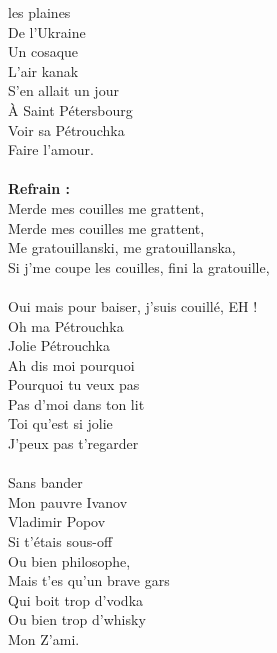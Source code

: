 
 les plaines
\\De l'Ukraine
\\Un cosaque
\\L'air kanak
\\S'en allait un jour
\\À Saint Pétersbourg
\\Voir sa Pétrouchka
\\Faire l'amour.
\\\\\textbf{Refrain :}
\\Merde mes couilles me grattent,
\\Merde mes couilles me grattent,
\\Me gratouillanski, me gratouillanska,
\\Si j'me coupe les couilles, fini la gratouille,
\\\\Oui mais pour baiser, j'suis couillé, EH !
\\Oh ma Pétrouchka
\\Jolie Pétrouchka
\\Ah dis moi pourquoi
\\Pourquoi tu veux pas
\\Pas d'moi dans ton lit
\\Toi qu'est si jolie
\\J'peux pas t'regarder
\\\\Sans bander
\\Mon pauvre Ivanov
\\Vladimir Popov
\\Si t'étais sous-off
\\Ou bien philosophe,
\\Mais t'es qu'un brave gars
\\Qui boit trop d'vodka
\\Ou bien trop d'whisky
\\Mon Z'ami.

\breakpage